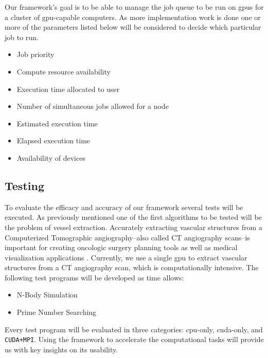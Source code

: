 Our framework's goal is to be able to manage the job queue to be run on
\glspl{gpu} for a cluster of \gls{gpu}-capable computers. As more
implementation work is done one or more of the parameters listed below will be
considered to decide which particular job to run.

\begin{itemize}
    \item Job priority
    \item Compute resource availability
    \item Execution time allocated to user
    \item Number of simultaneous jobs allowed for a node
    \item Estimated execution time
    \item Elapsed execution time
    \item Availability of devices
\end{itemize}


\subsection{Testing}

To evaluate the efficacy and accuracy of our framework several tests will be
executed. As previously mentioned one of the first algorithms to be tested will
be the problem of vessel extraction. Accurately extracting vascular structures
from a Computerized Tomographic angiography--also called CT angiography
scans--is important for creating oncologic surgery planning tools as well as
medical visualization applications \cite{erdt2008automatic}.  Currently, we use
a single \gls{gpu} to extract vascular structures from a CT angiography scan,
which is computationally intensive. The following test programs will be
developed as time allows:

\begin{itemize}
    \item N-Body Simulation
    \item Prime Number Searching
\end{itemize}

Every test program will be evaluated in three categories: \gls{cpu}-only,
\gls{cuda}-only, and \texttt{CUDA+MPI}. Using the framework to accelerate the
computational tasks will provide us with key insights on its usability.
